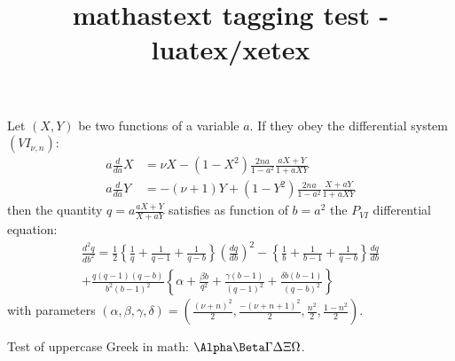 \documentclass{article}
\title{mathastext tagging test - luatex/xetex}
\begin{document}
Let $(X,Y)$ be two functions of a variable $a$. If they obey  the differential
system  $(VI_{\nu,n})$: 
\begin{align*}
a\frac{d}{da} X &= \nu
X - (1 - X^2)\frac{2n a}{1 - a^2}\frac{aX+Y}{1+a XY} \\  
a\frac{d}{da} Y &= -(\nu+1) Y
+ (1 - Y^2)\frac{2n a}{1 - a^2}\frac{X+aY}{1+a XY} 
\end{align*}
then the quantity $q = a \frac{aX+Y}{X+aY}$
satisfies as function of $b= a^2$  the $P_{VI}$ differential equation:
\begin{equation*}
\begin{split}
\frac{d^2 q}{db^2} = \frac12\left\{\frac1q+\frac1{q-1}
+\frac1{q-b}\right\}\left(\frac{dq}{db}\right)^2 - \left\{\frac1b+\frac1{b-1}
+\frac1{q-b}\right\}\frac{dq}{db}\\+\frac{q(q-1)(q-b)}{b^2(b-1)^2}\left\{\alpha+\frac{\beta
b}{q^2} + \frac{\gamma (b-1)}{(q-1)^2}+\frac{\delta
b(b-1)}{(q-b)^2}\right\}
\end{split}
\end{equation*}
with
parameters
$(\alpha,\beta,\gamma,\delta) = (\frac{(\nu+n)^2}2,
\frac{-(\nu+n+1)^2}2, \frac{n^2}2, \frac{1 - n^2}2)$.

Test of uppercase Greek in math: $\Alpha\Beta\Gamma\Delta\Xi\Omega$.
\end{document}
